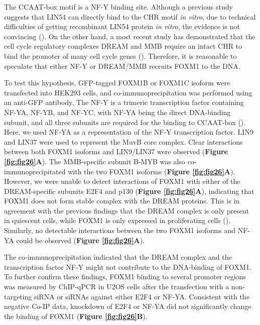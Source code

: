 The CCAAT-box motif is a NF-Y binding site. Although a previous study suggests that LIN54 can directly bind to the CHR motif \textit{in vitro}, due to technical difficulties of getting recombinant LIN54 protein \textit{in vitro}, the evidence is not convincing (\cite{schmit2009lin54}). On the other hand, a most recent study has demonstrated that the cell cycle regulatory complexes DREAM and MMB require an intact CHR to bind the promoter of many cell cycle genes (\cite{müller2012the}). Therefore, it is reasonable to speculate that either NF-Y or DREAM/MMB recruits FOXM1 to the DNA.

To test this hypothesis, GFP-tagged FOXM1B or FOXM1C isoform were transfected into HEK293 cells, and co-immunoprecipitation was performed using an anti-GFP antibody. The NF-Y is a trimeric transcription factor containing NF-YA, NF-YB, and NF-YC, with NF-YA being the direct DNA-binding subunit, and all three subunits are required for the binding to CCAAT-box (\cite{sinha1996three}). Here, we used NF-YA as a representation of the NF-Y transcription factor. LIN9 and LIN37 were used to represent the MuvB core complex. Clear interactions between both FOXM1 isoforms and LIN9/LIN37 were observed (\textbf{Figure \ref{fig:fig26}A}). The MMB-specific subunit B-MYB was also co-immunoprecipitated with the two FOXM1 isoforms (\textbf{Figure \ref{fig:fig26}A}). However, we were unable to detect interactions of FOXM1 with either of the DREAM-specific subunits E2F4 and p130 (\textbf{Figure \ref{fig:fig26}A}), indicating that FOXM1 does not form stable complex with the DREAM proteins. This is in agreement with the previous findings that the DREAM complex is only present in quiescent cells, while FOXM1 is only expressed in proliferating cells (\cite{litovchick2007evolutionarily,korver1997the}). Similarly, no detectable interactions between the two FOXM1 isoforms and NF-YA could be observed (\textbf{Figure \ref{fig:fig26}A}).

The co-immunoprecipitation indicated that the DREAM complex and the transcription factor NF-Y might not contribute to the DNA-binding of FOXM1. To further confirm these findings, FOXM1 binding to several promoter regions was measured by ChIP-qPCR in U2OS cells after the transfection with a non-targeting siRNA or siRNAs against either E2F4 or NF-YA. Consistent with the negative Co-IP data, knockdown of E2F4 or NF-YA did not significantly change the binding of FOXM1 (\textbf{Figure \ref{fig:fig26}B}).

